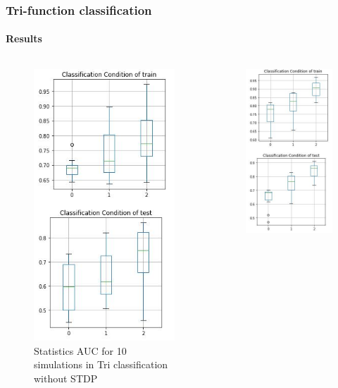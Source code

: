 \documentclass[10pt,aspectratio=43,mathserif, notes]{beamer}
\begin{document}
		\begin{frame}
		  \frametitle{\textbf{Tri-function classification}}
		  \framesubtitle{Results}
            \begin{columns}
            \begin{column}{0.5\textwidth}
            \begin{figure}[h]
            \centering
            \includegraphics[width=0.5\linewidth]{image/Tri_without_stdp.png}
            \caption{Statistics AUC for 10 simulations in Tri classification without STDP}
            \label{ST_Task}
            \end{figure}
            \end{column}
            \begin{column}{0.5\textwidth}
            \begin{figure}[h]
            \centering
            \includegraphics[width=0.5\linewidth]{image/Tri_with_stdp.png}

\end{figure}
\end{column}
\end{columns}
\end{frame}
\end{document}
